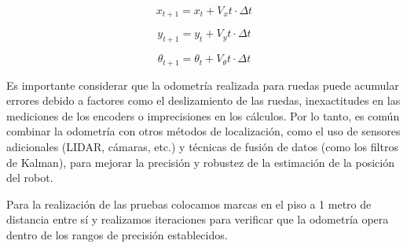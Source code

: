 $$ x_{t+1} = x_t + V_xt \cdot \Delta t $$

$$ y_{t+1} = y_t + V_yt \cdot \Delta t $$

$$ \theta_{t+1} = \theta_t + V_\theta t \cdot \Delta t $$

Es importante considerar que la odometría realizada para ruedas puede acumular errores debido a factores como el deslizamiento de las ruedas, inexactitudes en las mediciones de los encoders o imprecisiones en los cálculos. Por lo tanto, es común combinar la odometría con otros métodos de localización, como el uso de sensores adicionales (LIDAR, cámaras, etc.) y técnicas de fusión de datos (como los filtros de Kalman), para mejorar la precisión y robustez de la estimación de la posición del robot.

Para la realización de las pruebas colocamos marcas en el piso a 1 metro de distancia entre sí y realizamos iteraciones para verificar que la odometría opera dentro de los rangos de precisión establecidos.
